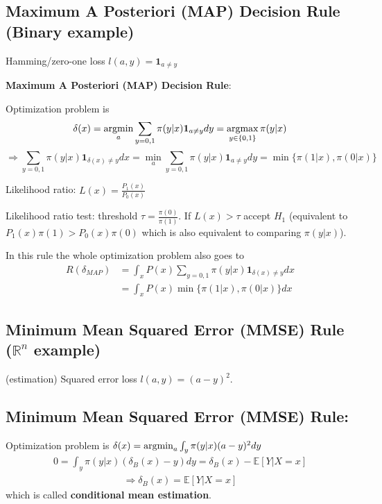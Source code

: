 \documentclass[11pt]{elegantbook}
\newcommand{\argmax}{\operatornamewithlimits{argmax}}
\newcommand{\argmin}{\operatornamewithlimits{argmin}}
\begin{document}
\subsection{Maximum A Posteriori (MAP) Decision Rule (Binary example)}
\begin{example}
    Hamming/zero-one loss $l(a,y)=\mathbf{1}_{a\neq y}$
\end{example}

\textbf{Maximum A Posteriori (MAP) Decision Rule}:

Optimization problem is $$\delta(x)=\argmin_{a} \sum_{y=0,1} \pi(y|x) \mathbf{1}_{a\neq y} dy=\argmax_{y\in\{0,1\}}\pi(y|x)$$
$$\Rightarrow \sum_{y=0,1} \pi(y|x) \mathbf{1}_{\delta(x)\neq y} dx=\min_{a} \sum_{y=0,1} \pi(y|x) \mathbf{1}_{a\neq y} dy=\min\{\pi(1|x),\pi(0|x)\}$$

Likelihood ratio: $L(x)=\frac{P_1(x)}{P_0(x)}$

Likelihood ratio test: threshold $\tau=\frac{\pi(0)}{\pi(1)}$. If $L(x)>\tau$ accept $H_1$ (equivalent to $P_1(x)\pi(1)>P_0(x)\pi(0)$ which is also equivalent to comparing $\pi(y|x)$).

In this rule the whole optimization problem also goes to
\begin{equation}
    \begin{aligned}
        R(\delta_{MAP})&=\int_x P(x)\sum_{y=0,1} \pi(y|x) \mathbf{1}_{\delta(x)\neq y} dx\\
        &=\int_x P(x)\min\{\pi(1|x),\pi(0|x)\}dx
    \end{aligned}
    \nonumber
\end{equation}

\subsection{Minimum Mean Squared Error (MMSE) Rule ($\mathbb{R}^n$ example)}
\begin{example}
    (estimation) Squared error loss $l(a,y)=(a-y)^2$.
\end{example}
\subsection*{Minimum Mean Squared Error (MMSE) Rule:}
Optimization problem is $\delta(x)=\argmin_{a} \int_{y} \pi(y|x) (a-y)^2 dy$
\begin{equation}
    \begin{aligned}
        0=\int_{y} \pi(y|x) (\delta_B(x)-y) dy=\delta_B(x)-\mathbb{E}\left[Y|X=x\right]
    \end{aligned}
    \nonumber
\end{equation}
\begin{equation}
    \begin{aligned}
        \Rightarrow \delta_B(x)=\mathbb{E}\left[Y|X=x\right]
    \end{aligned}
    \nonumber
\end{equation}
which is called \textbf{conditional mean estimation}.
\end{document}
